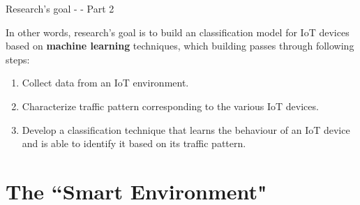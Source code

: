 \documentclass[10pt]{beamer}
\begin{document}
\begin{frame}{Research's goal - - Part 2}

In other words, research's goal is to build an classification model for IoT devices based on \textbf{machine learning} techniques, which building passes through following steps:

\begin{enumerate}
\justifying
\item Collect data from an IoT environment.
\item Characterize traffic pattern corresponding to the various IoT devices.
\item Develop a classification technique that learns the behaviour of an IoT device and is able to identify it based on its traffic pattern.
\end{enumerate}

\end{frame} 
\section{The ``Smart Environment"}
\end{document}
